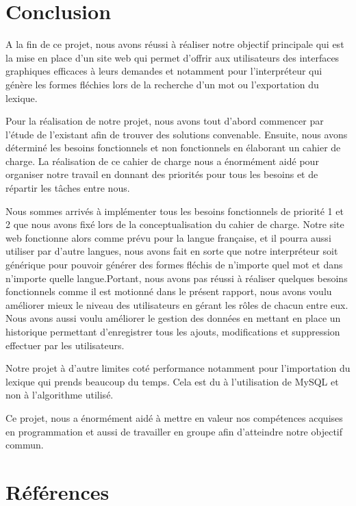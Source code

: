 \documentclass[12pt,a4paper]{article}
\begin{document}
\section{Conclusion}
  A la fin de ce projet, nous avons réussi à réaliser notre objectif principale 
qui est la mise en place d'un site web qui permet d'offrir aux utilisateurs des interfaces graphiques 
efficaces à leurs demandes et notamment pour l'interpréteur qui génère les formes fléchies lors de la recherche d'un mot ou l'exportation du lexique.


  Pour la réalisation de notre projet, nous avons tout d'abord commencer par l'étude de l'existant afin de trouver 
des solutions convenable. Ensuite, nous avons déterminé les besoins fonctionnels et non fonctionnels en élaborant 
un cahier de charge. La réalisation de ce cahier de charge nous a énormément aidé pour organiser notre travail en donnant des priorités 
pour tous les besoins et de répartir les tâches entre nous.
  
  Nous sommes arrivés à implémenter tous les besoins fonctionnels de priorité 1 et 2 que nous avons fixé lors de la conceptualisation du cahier de charge.
Notre site web fonctionne alors comme prévu pour la langue française, et il pourra aussi utiliser par d'autre langues, nous avons fait en sorte que notre interpréteur soit générique pour pouvoir générer des formes fléchis de n'importe quel mot et dans n'importe quelle langue.Portant, nous avons pas réussi à réaliser quelques besoins fonctionnels comme il est motionné dans le présent rapport, 
nous avons voulu améliorer mieux le niveau des utilisateurs en gérant les rôles de chacun entre eux. Nous avons aussi voulu améliorer le gestion des données 
en mettant en place un historique permettant d'enregistrer tous les ajouts, modifications et suppression effectuer par les utilisateurs. 

 Notre projet à d'autre limites coté performance notamment pour l'importation du lexique qui prends beaucoup du temps. Cela est du à l'utilisation de MySQL 
et non à l'algorithme utilisé.

 Ce projet, nous a énormément aidé à mettre en valeur nos compétences acquises en programmation et aussi de travailler en groupe afin d'atteindre notre objectif commun. 

\section{Références}
\end{document}
